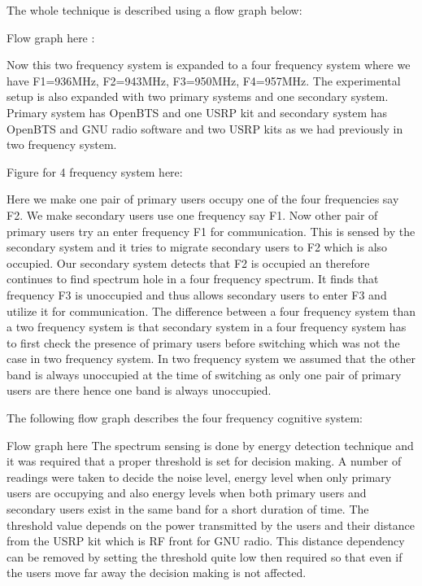 The whole technique is described using a flow graph below:

Flow graph here :

Now this two frequency system is expanded to a 
four frequency system where we have F1=936MHz, 
F2=943MHz, F3=950MHz, F4=957MHz. The experimental setup
is also expanded with two primary systems and one secondary
system. Primary system has OpenBTS and one USRP kit and
secondary system has OpenBTS and GNU radio software and 
two USRP kits as we had previously in two frequency system.
 
Figure for 4 frequency system here:


Here we make one pair of primary users occupy one of the four
frequencies say F2. We make secondary users use one frequency
say F1. Now other pair of primary users try an enter frequency
F1 for communication. This is sensed by the secondary system 
and it tries to migrate secondary users to F2 which is also 
occupied. Our secondary system detects that F2 is occupied an
therefore continues to find spectrum hole in a four frequency 
spectrum. It finds that frequency F3 is unoccupied and thus
allows secondary users to enter F3 and utilize it for communication.
The difference between a four frequency system than a two 
frequency system is that secondary system in a four frequency
system has to first check the presence of primary users before 
switching which was not the case in two frequency system. In 
two frequency system we assumed that the other band is always 
unoccupied at the time of switching as only one pair of primary
users are there hence one band is always unoccupied.

 The following flow graph describes the four frequency cognitive system:

Flow graph here
The spectrum sensing is done by energy detection technique and
it was required that a proper threshold is set for decision making. 
A number of readings were taken to decide the noise level, energy 
level when only primary users are occupying and also energy levels 
when both primary users and secondary users exist in the same band 
for a short duration of time. The threshold value depends on the
power transmitted by the users and their distance from the USRP 
kit which is RF front for GNU radio. This distance dependency can 
be removed by setting the threshold quite low then required so 
that even if the users move far away the decision making is not
affected. 





